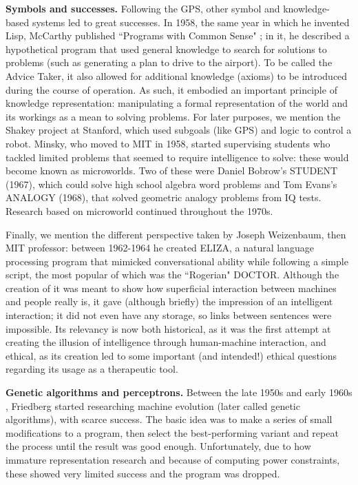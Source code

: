 \documentclass[../main.tex]{subfiles}
\begin{document}
\vspace{4pt}
\textbf{Symbols and successes.}
Following the GPS, other symbol and knowledge-based systems led to great successes. In 1958, the same year in which he invented Lisp, McCarthy published ``Programs with Common Sense" \parencite{mccarthyProgramsCommonSense1960}; in it, he described a hypothetical program that used general knowledge to search for solutions to problems (such as generating a plan to drive to the airport). To be called the Advice Taker, it also allowed for additional knowledge (axioms) to be introduced during the course of operation. As such, it embodied an important principle of knowledge representation: manipulating a formal representation of the world and its workings as a mean to solving problems.
For later purposes, we mention the Shakey project at Stanford, which used subgoals (like GPS) and logic to control a robot. Minsky, who moved to MIT in 1958, started supervising students who tackled limited problems that seemed to require intelligence to solve: these would become known as microworlds. Two of these were Daniel Bobrow's STUDENT (1967), which could solve high school algebra word problems and Tom Evans's ANALOGY (1968), that solved geometric analogy problems from IQ tests. Research based on microworld continued throughout the 1970s.

Finally, we mention the different perspective taken by Joseph Weizenbaum, then MIT professor: between 1962-1964 he created ELIZA, a natural language processing program that mimicked conversational ability while following a simple script, the most popular of which was the ``Rogerian" DOCTOR. Although the creation of it was meant to show how superficial interaction between machines and people really is, it gave (although briefly) the impression of an intelligent interaction; it did not even have any storage, so links between sentences were impossible. Its relevancy is now both historical, as it was the first attempt at creating the illusion of intelligence through human-machine interaction, and ethical, as its creation led to some important (and intended!) ethical questions regarding its usage as a therapeutic tool.

\vspace{4pt}
\textbf{Genetic algorithms and perceptrons.}
Between the late 1950s and early 1960s  \parencite{friedbergLearningMachinePart1958}, Friedberg started researching machine evolution (later called genetic algorithms), with scarce success. The basic idea was to make a series of small modifications to a program, then select the best-performing variant and repeat the process until the result was good enough. Unfortunately, due to how immature representation research and because of computing power constraints, these showed very limited success and the program was dropped.
\end{document}
